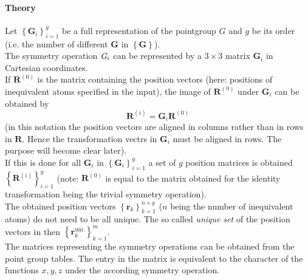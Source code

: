 \documentclass[a4paper,10pt]{scrartcl}
\begin{document}
\paragraph{Theory}
Let $\left\{\bm{G}_{i}\right\}_{i=1}^{g}$ be a full representation of the pointgroup $G$ and $g$ be its order (i.e. the number of different $\bm{G}$ in $\left\{\bm{G}\right\}$).\\
The symmetry operation $\emph{G}_{i}$ can be represented by a $3\times3$ matrix $\bm{G}_{i}$ in Cartesian coordinates.\\
If $\bm{R}^{(0)}$ is the matrix containing the position vectors (here: positions of inequivalent atoms specified in the input), the image of $\bm{R}^{(0)}$ under
$\bm{G}_{i}$ can be obtained by
\begin{equation}
 \bm{R}^{(i)} = \bm{G}_{i}\bm{R}^{(0)}
\end{equation}
(in this notation the position vectors are aligned in columns rather than in rows in $\bm{R}$. Hence the transformation vectrs in $\bm{G}_{i}$ must be aligned in rows.
The purpose will become clear later).\\
If this is done for all $\bm{G}_{i}$ in $\left\{\bm{G}_{i}\right\}_{i=1}^{g}$ a set of $g$ position matrices is obtained $\left\{\bm{R}^{(i)}\right\}_{i=1}^{g}$
(note: $\bm{R}^{(0)}$ is equal to the matrix obtained for the identity transformation being the trivial symmetry operation).\\
The obtained position vectors $\left\{\bm{r}_{k}\right\}_{k=1}^{n\times g}$ ($n$ being the number of inequivalent atoms) do not need to be all unique.
The so called \emph{unique set} of the position vectors in then $\left\{\bm{r}_{k}^{\text{uni.}}\right\}_{k=1}^{m}$.\\
The matrices representing the symmetry operations can be obtained from the point group tables. The entry in the matrix is equivalent to the
character of the functions $x,y,z$ under the according symmetry operation.
\end{document}
